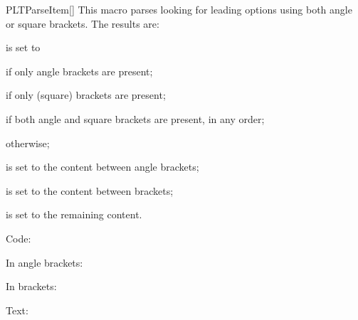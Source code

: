 \documentclass[a4paper, 11pt]{article}
\begin{document}
\begin{macro}{PLTParseItem}[]
    This macro parses  looking for leading options using both angle or square brackets. The results are:
    \begin{itemizeitemize}
        \item {} is set to
        \begin{itemizeitemize}
            \item {} if only angle brackets are present;
            \item {} if only (square) brackets are present;
            \item {} if both angle and square brackets are present, in any order;
            \item {} otherwise;
        \end{itemizeitemize}
        \item {} is set to the content between angle brackets;
        \item {} is set to the content between brackets;
        \item {} is set to the remaining content.
    \end{itemizeitemize}
\end{macro}

\begin{tcblisting}{}
    \noindent Code: \texttt{\opttype}\par
    In angle brackets: \texttt{\angleopts}\par
    In brackets: \texttt{\bracketopts}\par
    Text: \texttt{\body}\par
\end{tcblisting}
\end{document}

